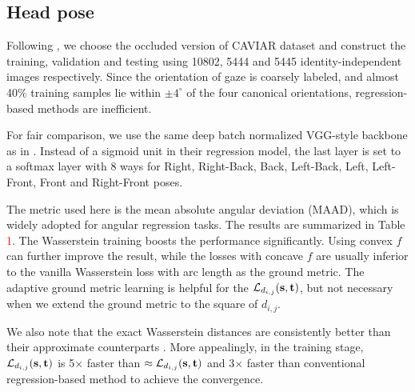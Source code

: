 \subsection{Head pose}
Following \cite{beyer2015biternion,prokudin2018deep}, we choose the occluded version of CAVIAR dataset \cite{fisher2005caviar} and construct the training, validation and testing using 10802, 5444 and 5445 identity-independent images respectively. Since the orientation of gaze is coarsely labeled, and almost 40\% training samples lie within ${\pm} 4^{\circ}$ of the four canonical orientations, regression-based methods \cite{beyer2015biternion,prokudin2018deep} are inefficient.   


For fair comparison, we use the same deep batch normalized VGG-style \cite{simonyan2014very} backbone as in \cite{beyer2015biternion,prokudin2018deep}. Instead of a sigmoid unit in their regression model, the last layer is set to a softmax layer with 8 ways for Right, Right-Back, Back, Left-Back, Left, Left-Front, Front and Right-Front poses. 

The metric used here is the mean absolute angular deviation (MAAD), which is widely adopted for angular regression tasks. The results are summarized in Table \textcolor{red}{1}. The Wasserstein training boosts the performance significantly. Using convex $f$ can further improve the result, while the losses with concave $f$ are usually inferior to the vanilla Wasserstein loss with arc length as the ground metric. The adaptive ground metric learning is helpful for the $\mathcal{L}_{d_{i,j}}(\rm{\textbf{s},{\textbf{t}}})$, but not necessary when we extend the ground metric to the square of $d_{i,j}$.


We also note that the exact Wasserstein distances are consistently better than their approximate counterparts \cite{cuturi2013sinkhorn}. More appealingly, in the training stage, $\mathcal{L}_{d_{i,j}}(\rm{\textbf{s},{\textbf{t}}})$ is 5$\times$ faster than $\approx\mathcal{L}_{d_{i,j}}(\rm{\textbf{s},{\textbf{t}}})$ and 3$\times$ faster than conventional regression-based method \cite{prokudin2018deep} to achieve the convergence. 

